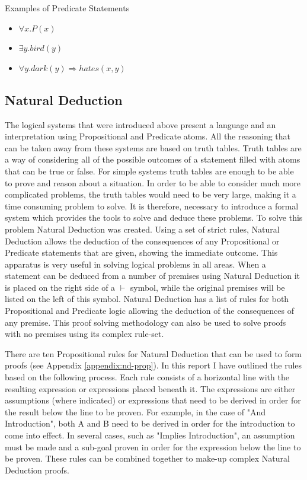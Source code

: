 \begin{exmp}Examples of Predicate Statements
\begin{itemize}
\item $\forall x.P(x)$
\item $\exists y.bird(y)$
\item $\forall y.dark(y) \Rightarrow hates(x,y)$
\end{itemize}
\end{exmp}

\subsection{Natural Deduction}

The logical systems that were introduced above present a language and an interpretation using Propositional and Predicate atoms. All the reasoning that can be taken away from these systems are based on truth tables. Truth tables are a way of considering all of the possible outcomes of a statement filled with atoms that can be true or false. For simple systems truth tables are enough to be able to prove and reason about a situation. In order to be able to consider much more complicated problems, the truth tables would need to be very large, making it a time consuming problem to solve. It is therefore, necessary to introduce a formal system which provides the tools to solve and deduce these problems. To solve this problem Natural Deduction was created. Using a set of strict rules, Natural Deduction allows the deduction of the consequences of any Propositional or Predicate statements that are given, showing the immediate outcome. This apparatus is very useful in solving logical problems in all areas. When a statement can be deduced from a number of premises using Natural Deduction it is placed on the right side of a $\vdash$ symbol, while the original premises will be listed on the left of this symbol. Natural Deduction has a list of rules for both Propositional and Predicate logic allowing the deduction of the consequences of any premise. This proof solving methodology can also be used to solve proofs with no premises using its complex rule-set.

There are ten Propositional rules for Natural Deduction that can be used to form proofs (see Appendix \ref{appendix:nd-prop}). In this report I have outlined the rules based on the following process. Each rule consists of a horizontal line with the resulting expression or expressions placed beneath it. The expressions are either assumptions (where indicated) or expressions that need to be derived in order for the result below the line to be proven. For example, in the case of "And Introduction", both A and B need to be derived in order for the introduction to come into effect. In several cases, such as "Implies Introduction", an assumption must be made and a sub-goal proven in order for the expression below the line to be proven. These rules can be combined together to make-up complex Natural Deduction proofs.

